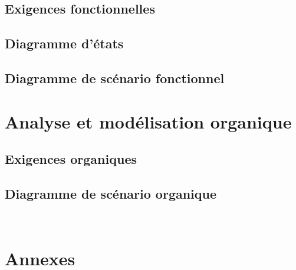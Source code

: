 \documentclass{article}
\begin{document}
\subsection{Exigences fonctionnelles}

\clearpage

\subsection{Diagramme d'états}


\subsection{Diagramme de scénario fonctionnel}

\clearpage



\clearpage


\section{Analyse et modélisation organique}



\subsection{Exigences organiques}

\clearpage


\subsection{Diagramme de scénario organique}

\clearpage



\clearpage


\

\section{Annexes}
\end{document}
